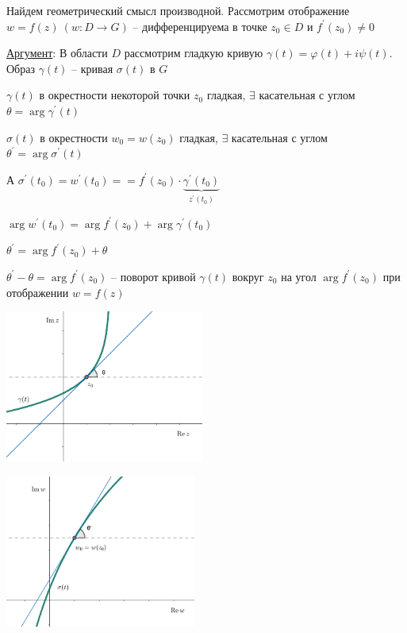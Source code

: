 Найдем геометрический смысл производной. Рассмотрим отображение $w = f(z) \ (w : D \longrightarrow G)$ -- дифференцируема в точке $z_0 \in D$ и $f^\prime(z_0) \neq 0$

\underline{Аргумент}: В области $D$ рассмотрим гладкую кривую $\gamma(t) = \varphi(t) + i\psi(t)$. Образ $\gamma(t)$ -- кривая $\sigma(t)$ в $G$

$\gamma(t)$ в окрестности некоторой точки $z_0$ гладкая, $\exists$ касательная с углом $\theta = \arg \gamma^\prime(t)$

$\sigma(t)$ в окрестности $w_0 = w(z_0)$ гладкая, $\exists$ касательная с углом $\theta^\prime = \arg \sigma^\prime(t)$

А $\sigma^\prime(t_0) = w^\prime (t_0) = =f^\prime(z_0) \cdot \underset{z^\prime(t_0)}{\underbrace{\gamma^\prime(t_0)}}$

$\arg w^\prime(t_0) = \arg f^\prime (z_0) + \arg \gamma^\prime(t_0)$

$\theta^\prime = \arg f^\prime(z_0) + \theta$

$\theta^\prime - \theta = \arg f^\prime (z_0)$ -- поворот кривой $\gamma(t)$ вокруг $z_0$ на угол $\arg f^\prime(z_0)$ при отображении $w = f(z)$

\begin{multicols}{2}
    \begin{center}
        \includegraphics[height=5cm]{addchapters2/images/addchapters2_2025_03_21_1}

        \includegraphics[height=5cm]{addchapters2/images/addchapters2_2025_03_21_2}
    \end{center}
\end{multicols}


